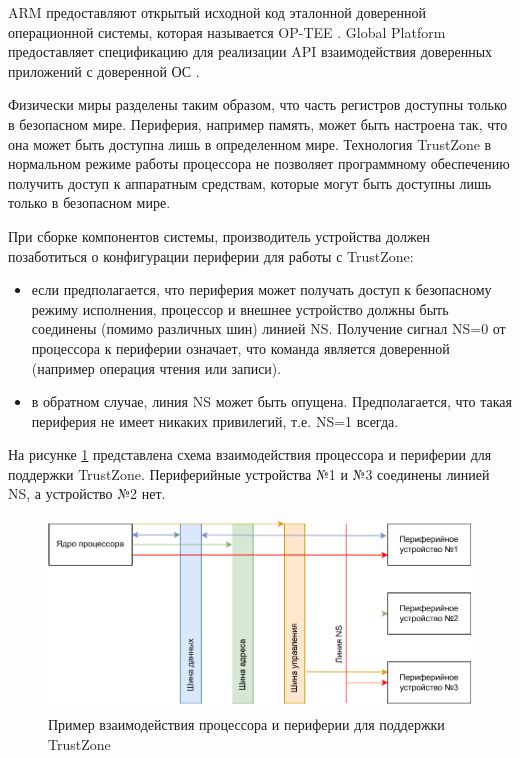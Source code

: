 ARM предоставляют открытый исходной код эталонной доверенной операционной системы, которая называется OP-TEE \cite{optee}. Global Platform предоставляет спецификацию для реализации API взаимодействия доверенных приложений \cite{teec-spec} с доверенной ОС \cite{tee-spec}.

Физически миры разделены таким образом, что часть регистров доступны только в безопасном мире. Периферия, например память, может быть настроена так, что она может быть доступна лишь в определенном мире. Технология TrustZone в нормальном режиме работы процессора не позволяет программному обеспечению получить доступ к аппаратным средствам, которые могут быть доступны лишь только в безопасном мире. 

При сборке компонентов системы, производитель устройства должен позаботиться о конфигурации периферии для работы с TrustZone:

\begin{itemize}
	\item если предполагается, что периферия может получать доступ к безопасному режиму исполнения, процессор и внешнее устройство должны быть соединены (помимо различных шин) линией NS. Получение сигнал NS=0 от процессора к периферии означает, что команда является доверенной (например операция чтения или записи).
	\item в обратном случае, линия NS может быть опущена. Предполагается, что такая периферия не имеет никаких привилегий, т.е. NS=1 всегда.
\end{itemize}

На рисунке \ref{fig:ns-bit} представлена схема взаимодействия процессора и периферии для поддержки TrustZone. Периферийные устройства №1 и №3 соединены линией NS, а устройство №2 нет.

\begin{figure}[h]
	\centering
	\includegraphics[width=\textwidth]{img/arm-ns.pdf}
	\caption{Пример взаимодействия процессора и периферии для поддержки TrustZone}
	\label{fig:ns-bit}
\end{figure}

